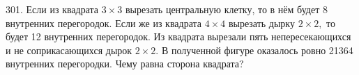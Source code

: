 301. Если из квадрата $3\times3$ вырезать центральную клетку, то в нём будет 8 внутренних перегородок. Если же из квадрата $4\times4$ вырезать дырку $2\times2,$ то будет 12 внутренних перегородок. Из квадрата вырезали пять непересекающихся и не соприкасающихся дырок $2\times2.$ В полученной фигуре оказалось ровно 21364 внутренних перегородки. Чему равна сторона квадрата?\\
